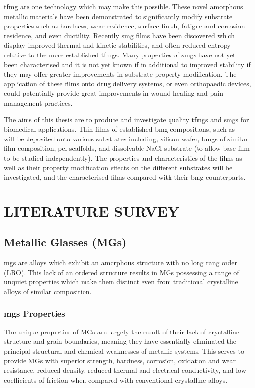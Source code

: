\documentclass[draft,a4paper,12pt,oneside]{report}%
\begin{document}
\Gls{tfmg} are one technology which may make this possible. These novel amorphous metallic materials have been demonstrated to significantly modify substrate properties such as hardness, wear residence, surface finish, fatigue and corrosion residence, and even ductility. Recently \gls{smg} films have been discovered which display improved thermal and kinetic stabilities, and often reduced entropy relative to the more established \gls{tfmg}s. Many properties of \gls{smg}s have not yet been characterised and it is not yet known if in additional to improved stability if they may offer greater improvements in substrate property modification. The application of these films onto drug delivery systems, or even orthopaedic devices, could potentially provide great improvements in wound healing and pain management practices.

The aims of this thesis are to produce and investigate quality \gls{tfmg}s and \gls{smg}s for biomedical applications. Thin films of established \gls{bmg} compositions, such as \MgZnCa~ will be deposited onto various substrates including; silicon wafer, \gls{bmg}s of similar film composition, \Gls{pcl} scaffolds, and dissolvable NaCl substrate (to allow base film to be studied independently). The properties and characteristics of the films as well as their property modification effects on the different substrates will be investigated, and the characterised films compared with their \gls{bmg} counterparts. 

\chapter{LITERATURE SURVEY} 
\glsresetall
{}
\section{Metallic Glasses (MGs)}
\Glspl{mg} are alloys which exhibit an amorphous structure with no long rang order (LRO). This lack of an ordered structure results in MGs possessing a range of unquiet properties which make them distinct even from traditional crystalline alloys of similar composition.

\subsection{\Glspl{mg} Properties}
The unique properties of MGs are largely the result of their lack of crystalline structure and grain boundaries, meaning they have essentially eliminated the principal structural and chemical weaknesses of metallic systems. This serves to provide MGs with superior strength, hardness, corrosion, oxidation and wear resistance, reduced density, reduced thermal and electrical conductivity, and low coefficients of friction when compared with conventional crystalline alloys. 
 
\end{document}
